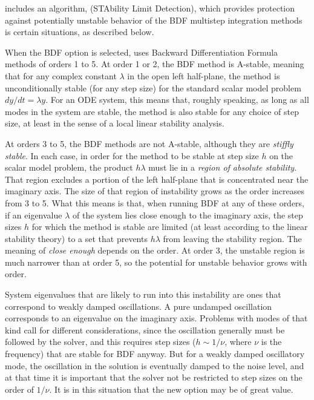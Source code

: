 {\cvode} includes an algorithm, {\stald} (STAbility Limit Detection),
which provides protection against potentially unstable behavior of the 
BDF multistep integration methods is certain situations, as described below.

When the BDF option is selected, {\cvode} uses Backward Differentiation 
Formula methods of orders 1 to 5.  At order 1 or 2, the BDF
method is A-stable, meaning that for any complex constant $\lambda$ in
the open left half-plane, the method is unconditionally stable (for
any step size) for the standard scalar model problem $dy/dt = \lambda y$.
For an ODE system, this means that, roughly speaking, as long as all
modes in the system are stable, the method is also stable for any
choice of step size, at least in the sense of a local linear stability
analysis.

At orders 3 to 5, the BDF methods are not A-stable, although they are
{\em stiffly stable}. In each case, in order for the method to be stable
at step size $h$ on the scalar model problem, the product $h\lambda$ must
lie in a {\em region of absolute stability}. 
That region excludes a portion of the left half-plane that is concentrated 
near the imaginary axis.  The size of that region of instability grows as the order
increases from 3 to 5.  What this means is that, when running BDF at
any of these orders, if an eigenvalue $\lambda$ of the system lies close
enough to the imaginary axis, the step sizes $h$ for which the method is
stable are limited (at least according to the linear stability theory)
to a set that prevents $h\lambda$ from leaving the stability region.
The meaning of {\em close enough} depends on the order.  
At order 3, the unstable region is much narrower than at order 5, 
so the potential for unstable behavior grows with order.

System eigenvalues that are likely to run into this instability are
ones that correspond to weakly damped oscillations.  A pure undamped
oscillation corresponds to an eigenvalue on the imaginary axis.
Problems with modes of that kind call for different considerations,
since the oscillation generally must be followed by the solver, and
this requires step sizes ($h \sim 1/\nu$, where $\nu$ is the frequency) 
that are stable for BDF anyway.  But for a weakly damped oscillatory mode,
the oscillation in the solution is eventually damped to the noise level, 
and at that time it is important that the solver not be restricted to step 
sizes on the order of $1/\nu$.  It is in this situation that the new option may
be of great value.

